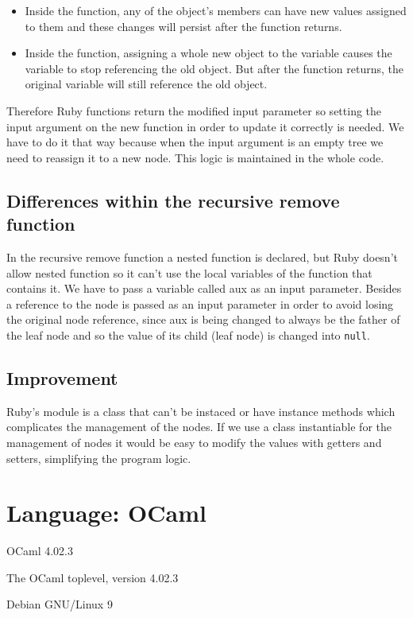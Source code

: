 \documentclass[11pt]{scrartcl} %
\begin{document}
 \begin{itemize}
\item Inside the function, any of the object's members can have new values assigned to them and these changes will persist after the function returns.
\item Inside the function, assigning a whole new object to the variable causes the variable to stop referencing the old object. But after the function returns, the original variable will still reference the old object.
\end{itemize}

	Therefore Ruby functions return the modified input parameter so setting the input argument on the new function in order to update it correctly is needed.
	We have to do it that way because when the input argument is an empty tree we need to reassign it to a new node. This logic is maintained in the whole code.
	
\subsection*{Differences within the recursive remove function}

In the recursive remove function a nested function is declared, but Ruby doesn't allow nested function so it can't use the local variables of the function that contains it. We have to pass a variable called aux as an input parameter. Besides a reference to the node is passed as an input parameter in order to avoid losing the original node reference, since aux is being changed to always be the father of the leaf node and so the value of its child (leaf node) is changed into \texttt{null}.
 
\subsection*{Improvement}

Ruby's module is a class that can't be instaced or have instance methods which complicates the management of the nodes. If we use a class instantiable for the management of nodes it would be easy to modify the values with getters and setters, simplifying the program logic.

\section{Language: OCaml}

\begin{description}[align=left,labelwidth=10em]
\item [Language Version] OCaml 4.02.3
\item [Interpreter] The OCaml toplevel, version 4.02.3
\item [Operating System] Debian GNU/Linux 9
\end{description}
\end{document}
